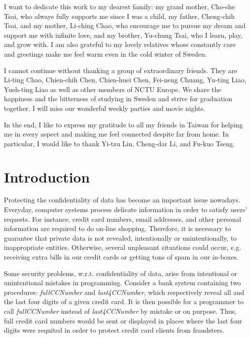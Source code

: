\documentclass{report}
\begin{document}
I want to dedicate this work to my dearest family: my grand mother, Cho-she Tsai, who always fully supports
me since I was a child, my father, Cheng-chih Tsai, and my mother, Li-ching Chao, who encourage me
to pursue my dream and support me with infinite love, and my brother, Yu-chung Tsai, who I learn, play, 
and grow with. I am also grateful to my lovely relatives whose constantly care and greetings make me
feel warm even in the cold winter of Sweden.

I cannot continue without thanking a group of extraordinary friends. They are Li-ting Chao, 
Chien-chih Chen, Chien-huei Chen, Fei-neng Chuang, Yu-ting Liao, Yueh-ting Liao as well as
other members of NCTU Europe. We share the happiness and the bitterness of studying in Sweden and
strive for graduation together. I will miss our wonderful weekly parties and movie nights.

In the end, I like to express my gratitude to all my friends in Taiwan for helping me
in every aspect and making me feel connected despite far from home.
In particular, I would like to thank Yi-tzu Lin, Cheng-dar Li, and Fu-kuo Tseng.


\cleardoublepage
\pagestyle{plain}


\chapter{Introduction}
\label{Chap:Introduction}


Protecting the confidentiality of data has become an important 
issue nowadays. Everyday, computer systems process delicate information in
order to satisfy users' requests. For instance, credit card numbers,
email addresses, and other personal information are required to do on-line
shopping.
Therefore, it is necessary to guarantee that private data is not
revealed, intentionally or unintentionally, to inappropriate entities.
Otherwise, several unpleasant situations could occur, 
e.g. receiving extra bills in our credit
cards or getting tons of spam in our in-boxes. 
 
Some security problems, w.r.t. confidentiality of data,
arise from intentional or unintentional mistakes in programming.
Consider a bank system containing two procedures:
 \emph{fullCCNumber} and \emph{last4CCNumber}, which respectively reveal 
all and the last four digits of a given credit card. It is then
possible for a programmer to call \emph{fullCCNumber} instead of 
\emph{last4CCNumber} by mistake or on purpose. Thus, full credit card numbers would be 
sent or displayed in places where the last four digits were 
requited in order to protect credit card clients from fraudsters.
\end{document}

